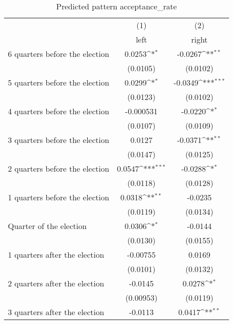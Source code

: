\begin{table}[htbp]\centering
\def\sym#1{\ifmmode^{#1}\else\(^{#1}\)\fi}
\caption{Predicted pattern acceptance\_rate}
\begin{tabular}{l*{2}{c}}
\hline\hline
                    &\multicolumn{1}{c}{(1)}&\multicolumn{1}{c}{(2)}\\
                    &\multicolumn{1}{c}{left}&\multicolumn{1}{c}{right}\\
\hline
 6 quarters before the election&      0.0253\sym{*}  &     -0.0267\sym{**} \\
                    &    (0.0105)         &    (0.0102)         \\
[1em]
 5 quarters before the election&      0.0299\sym{*}  &     -0.0349\sym{***}\\
                    &    (0.0123)         &    (0.0102)         \\
[1em]
 4 quarters before the election&   -0.000531         &     -0.0220\sym{*}  \\
                    &    (0.0107)         &    (0.0109)         \\
[1em]
 3 quarters before the election&      0.0127         &     -0.0371\sym{**} \\
                    &    (0.0147)         &    (0.0125)         \\
[1em]
 2 quarters before the election&      0.0547\sym{***}&     -0.0288\sym{*}  \\
                    &    (0.0118)         &    (0.0128)         \\
[1em]
 1 quarters before the election&      0.0318\sym{**} &     -0.0235         \\
                    &    (0.0119)         &    (0.0134)         \\
[1em]
Quarter of the election&      0.0306\sym{*}  &     -0.0144         \\
                    &    (0.0130)         &    (0.0155)         \\
[1em]
 1 quarters after the election&    -0.00755         &      0.0169         \\
                    &    (0.0101)         &    (0.0132)         \\
[1em]
 2 quarters after the election&     -0.0145         &      0.0278\sym{*}  \\
                    &   (0.00953)         &    (0.0119)         \\
[1em]
 3 quarters after the election&     -0.0113         &      0.0417\sym{**} \\

\end{tabular}
\end{table}
